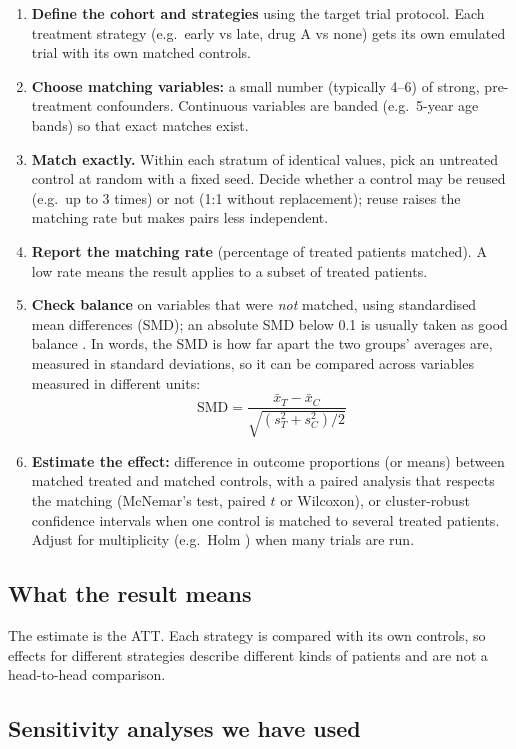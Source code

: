 \begin{enumerate}
\item \textbf{Define the cohort and strategies} using the target trial protocol. Each treatment strategy (e.g.\ early vs late, drug A vs none) gets its own emulated trial with its own matched controls.
\item \textbf{Choose matching variables:} a small number (typically 4--6) of strong, pre-treatment confounders. Continuous variables are banded (e.g.\ 5-year age bands) so that exact matches exist.
\item \textbf{Match exactly.} Within each stratum of identical values, pick an untreated control at random with a fixed seed. Decide whether a control may be reused (e.g.\ up to 3 times) or not (1:1 without replacement); reuse raises the matching rate but makes pairs less independent.
\item \textbf{Report the matching rate} (percentage of treated patients matched). A low rate means the result applies to a subset of treated patients.
\item \textbf{Check balance} on variables that were \emph{not} matched, using standardised mean differences (SMD); an absolute SMD below 0.1 is usually taken as good balance \cite{austin2009}. In words, the SMD is how far apart the two groups' averages are, measured in standard deviations, so it can be compared across variables measured in different units:
\[ \mathrm{SMD} = \frac{\bar{x}_T - \bar{x}_C}{\sqrt{(s_T^2 + s_C^2)/2}} \]
\item \textbf{Estimate the effect:} difference in outcome proportions (or means) between matched treated and matched controls, with a paired analysis that respects the matching (McNemar's test, paired $t$ or Wilcoxon), or cluster-robust confidence intervals when one control is matched to several treated patients. Adjust for multiplicity (e.g.\ Holm \cite{holm1979}) when many trials are run.
\end{enumerate}

\subsection{What the result means}

The estimate is the ATT. Each strategy is compared with its own controls, so effects for different strategies describe different kinds of patients and are not a head-to-head comparison.

\subsection{Sensitivity analyses we have used}


